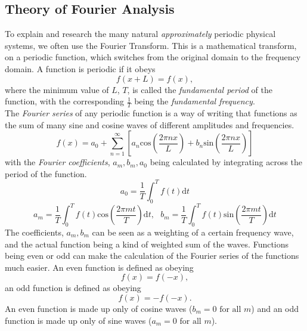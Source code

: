 \documentclass{article}
\begin{document}
\subsection{Theory of Fourier Analysis}
To explain and research the many natural \textit{approximately} periodic physical systems, we often use the Fourier Transform. This is a mathematical transform, on a periodic function, which switches from the original domain to the frequency domain. A function is periodic if it obeys
\begin{equation}
f(x+L)=f(x),
\end{equation}
where the minimum value of $L$, $T$, is called the \textit{fundamental period} of the function, with the corresponding $\frac{1}{T}$ being the \textit{fundamental frequency}.\\
\indent The \textit{Fourier series} of any periodic function is a way of writing that functions as the sum of many sine and cosine waves of different amplitudes and frequencies.
\begin{equation}
f(x)=a_0+\sum_{n=1}^{\infty}\left[a_{n}\mathrm{cos}\left(\frac{2\pi nx}{L}\right)+b_{n}\mathrm{sin}\left(\frac{2\pi nx}{L}\right)\right]
\label{eq: FourierSeries}
\end{equation}
with the \textit{Fourier coefficients}, $a_m, b_m, a_0$ being calculated by integrating across the period of the function.
\begin{equation}
a_0 = \frac{1}{T}\int_0^Tf(t)\mathrm{d}t
\label{eq: a0}
\end{equation}
\begin{equation}
a_m = \frac{1}{T}\int_0^Tf(t)\mathrm{cos}\left(\frac{2 \pi m t}{T}\right)\mathrm{d}t,~~~b_m = \frac{1}{T}\int_0^Tf(t)\mathrm{sin}\left(\frac{2 \pi m t}{T}\right)\mathrm{d}t
\label{eq:anbncoeffs}
\end{equation}
The coefficients, $a_m, b_m$ can be seen as a weighting of a certain frequency wave, and the actual function being a kind of weighted sum of the waves.
\indent Functions being even or odd can make the calculation of the Fourier series of the functions much easier. An even function is defined as obeying
\begin{equation}
f(x)=f(-x),
\end{equation}
an odd function is defined as obeying
\begin{equation}
f(x)=-f(-x).
\end{equation}
An even function is made up only of cosine waves ($b_m = 0 \text{ for all } m$) and an odd function is made up only of sine waves ($a_m = 0 \text{ for all } m$).\\
\end{document}
